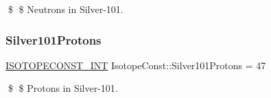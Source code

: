 \$ \$ Neutrons in Silver-\/101. \mbox{\label{group___isotope_const-_silver-_ag101_gac79582b9b26781a784c9d03710356fb9}} 
\subsubsection{\texorpdfstring{Silver101\+Protons}{Silver101Protons}}
{\footnotesize\ttfamily \mbox{\hyperlink{group___isotope_const-_macros_ga5f18360b3e99483a35c32d789e62621c}{I\+S\+O\+T\+O\+P\+E\+C\+O\+N\+S\+T\+\_\+\+I\+NT}} Isotope\+Const\+::\+Silver101\+Protons = 47}

\$ \$ Protons in Silver-\/101. 